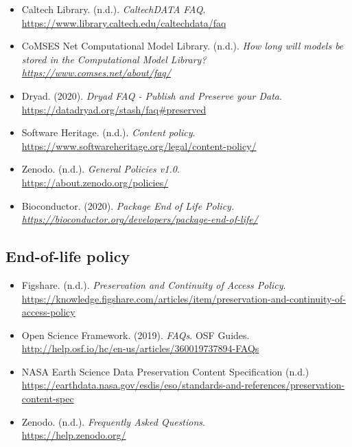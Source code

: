 \documentclass[11pt]{article}
\begin{document}
\begin{itemize}

\item Caltech Library. (n.d.). \emph{CaltechDATA FAQ}.\\
\url{https://www.library.caltech.edu/caltechdata/faq}

\item CoMSES Net Computational Model Library. (n.d.). \emph{How long will models be stored in the Computational Model Library?\\
\url{https://www.comses.net/about/faq/}}

\item Dryad. (2020). \emph{Dryad FAQ - Publish and Preserve your Data}.\\
\url{https://datadryad.org/stash/faq\#preserved}

\item Software Heritage. (n.d.). \emph{Content policy}.\\
\url{https://www.softwareheritage.org/legal/content-policy/}

\item Zenodo. (n.d.). \emph{General Policies v1.0}.\\
\url{https://about.zenodo.org/policies/}

\item Bioconductor. (2020). \emph{Package End of Life Policy.\\
\url{https://bioconductor.org/developers/package-end-of-life/} }

\end{itemize}


\subsection{End-of-life policy}
\label{end-of-life-policy}

\begin{itemize}

\item Figshare. (n.d.). \emph{Preservation and Continuity of Access Policy}.\\
\url{https://knowledge.figshare.com/articles/item/preservation-and-continuity-of-access-policy}

\item Open Science Framework. (2019). \emph{FAQs}. OSF Guides.\\
\url{http://help.osf.io/hc/en-us/articles/360019737894-FAQs}

\item NASA Earth Science Data Preservation Content Specification (n.d.)\\
\url{https://earthdata.nasa.gov/esdis/eso/standards-and-references/preservation-content-spec}

\item Zenodo. (n.d.). \emph{Frequently Asked Questions}.\\
\url{https://help.zenodo.org/}

\end{itemize}
\end{document}
